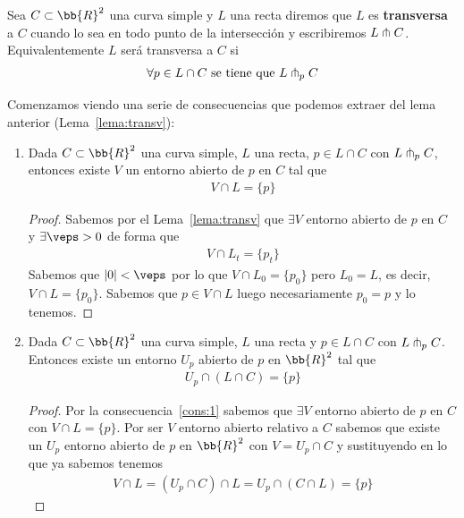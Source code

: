 \begin{definicion}\label{def:transv}
    Sea $C\subset \bb{R}^2$ una curva simple y $L$ una recta diremos que $L$ es \textbf{transversa} a $C$ cuando lo sea en todo punto de la intersección y escribiremos $L \pitchfork C$. Equivalentemente $L$ será transversa a $C$ si
    \begin{gather*}
        \forall p\in L\cap C \text{ se tiene que } L \pitchfork_p C
    \end{gather*}
\end{definicion}

\begin{observacion}
    Comenzamos viendo una serie de consecuencias que podemos extraer del lema anterior (Lema~\ref{lema:transv}):
    \begin{enumerate}
        \item\label{cons:1} Dada $C\subset \bb{R}^2$ una curva simple, $L$ una recta, $p\in L \cap C $ con $L \pitchfork_p C$, entonces existe $V$ un entorno abierto de $p$ en $C$ tal que 
        \begin{gather*}
            V \cap L = \{p\}
        \end{gather*}
        \begin{proof}
            Sabemos por el Lema~\ref{lema:transv} que $\exists V$ entorno abierto de $p$ en $C$ y $\exists \veps>0$ de forma que 
            \begin{gather*}
                V \cap L_t = \{p_t\}
            \end{gather*}
            Sabemos que $|0|<\veps$ por lo que $V\cap L_0 = \{p_0\}$ pero $L_0=L$, es decir, $V\cap L=\{p_0\}$. Sabemos que $p\in V\cap L$ luego necesariamente $p_0=p$ y lo tenemos.
        \end{proof}
        \item\label{cons:2} Dada $C\subset \bb{R}^2$ una curva simple, $L$ una recta y $p\in L\cap C$ con $L\pitchfork_pC$. Entonces existe un entorno $U_p$ abierto de $p$ en $\bb{R}^2$ tal que 
        \begin{gather*}
            U_p \cap (L\cap C) = \{p\}
        \end{gather*}
        \begin{proof}
            Por la consecuencia~\ref{cons:1} sabemos que $\exists V$ entorno abierto de $p$ en $C$ con $V\cap L = \{p\}$. Por ser $V$ entorno abierto relativo a $C$ sabemos que existe un $U_p$ entorno abierto de $p$ en $\bb{R}^2$ con $V=U_p\cap C$ y sustituyendo en lo que ya sabemos tenemos
            \begin{gather*}
                V\cap L =(U_p \cap C)\cap L = U_p \cap (C\cap L) = \{p\}
            \end{gather*}
        \end{proof}


\end{enumerate}
\end{observacion}
